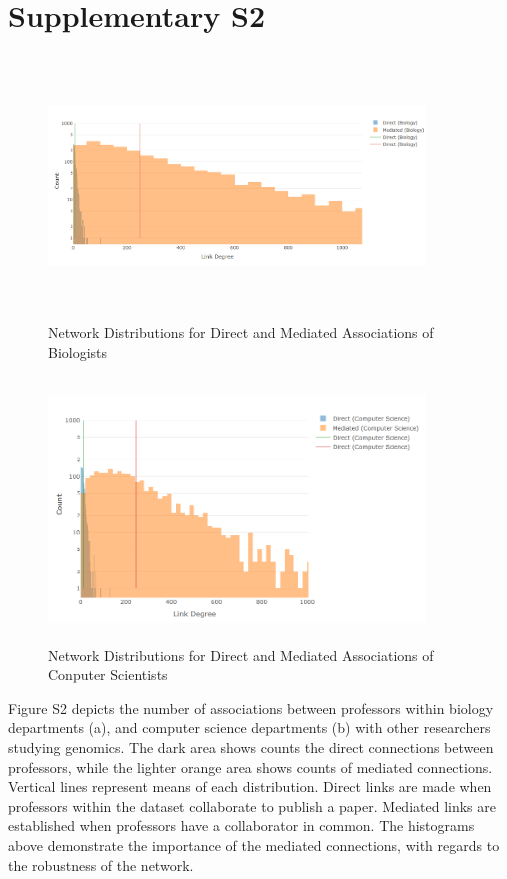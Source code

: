 \documentclass[10pt]{article}         %
\begin{document}
\section{Supplementary S2}
\begin{figure}[!htb]
  \centering
  \includegraphics[width=10cm, height=7cm]{FigS2A.png}
  \caption{Network Distributions for Direct and Mediated Associations of Biologists}
  \label{fig:S2A}
\end{figure}
\begin{figure}[!htb]
  \centering
  \includegraphics[width=10cm, height=7cm]{FigS2B.png}
  \caption{Network Distributions for Direct and Mediated Associations of Conputer Scientists}
  \label{fig:S2B}
\end{figure}
Figure S2 depicts the number of associations between professors within biology departments (a), and computer science departments (b) with other researchers studying genomics. The dark area shows counts the direct connections between professors, while the lighter orange area shows counts of mediated connections. Vertical lines represent means of each distribution. Direct links are made when professors within the dataset collaborate to publish a paper. Mediated links are established when professors have a collaborator in common. The histograms above demonstrate the importance of the mediated connections, with regards to the robustness of the network. 
\end{document}
